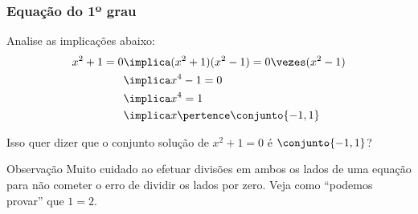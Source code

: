 
\begin{frame}
\frametitle{Equação do 1º grau} 


\begin{exemplo}
	Analise as implicações abaixo:
	\begin{align*}
		x^2+1=0 & \implica (x^2+1)(x^2-1) = 0\vezes(x^2-1) \\
				& \implica x^4-1 = 0 \\
				& \implica x^4 = 1 \\
				& \implica x \pertence \conjunto{-1, 1}
	\end{align*}

	Isso quer dizer que o conjunto solução de $x^2 +1 = 0$ é $\conjunto{-1, 1}$?
\end{exemplo}\pause


\begin{block}{Observação}
Muito cuidado ao efetuar divisões em ambos os lados de uma equação
para não cometer o erro de dividir os lados por zero. Veja como ``podemos provar'' que $1 = 2$.
\end{block}

\end{frame}



